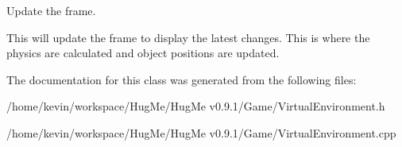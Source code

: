Update the frame. 

This will update the frame to display the latest changes. This is where the physics are calculated and object positions are updated. 

The documentation for this class was generated from the following files:\begin{DoxyCompactItemize}
\item 
/home/kevin/workspace/HugMe/HugMe v0.9.1/Game/VirtualEnvironment.h\item 
/home/kevin/workspace/HugMe/HugMe v0.9.1/Game/VirtualEnvironment.cpp\end{DoxyCompactItemize}
